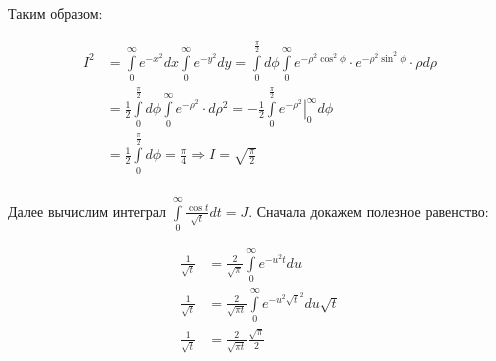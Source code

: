\documentclass{article}
\begin{document}
Таким образом:

\begin{equation*}
\begin{aligned}
I^2 &= \int\limits_0^{\infty} e^{-x^2}dx \int\limits_0^{\infty} e^{-y^2}dy = \int\limits_0^{\frac{\pi}{2}} d\phi \int\limits_0^{\infty} e^{-\rho^2 \cos^2{\phi}}\cdot e^{-\rho^2 \sin^2{\phi}}  \cdot \rho d\rho \\
&= \frac{1}{2}\int\limits_0^{\frac{\pi}{2}} d\phi \int\limits_0^{\infty} e^{-\rho^2}  \cdot  d\rho^2 = -\frac{1}{2}\int\limits_0^{\frac{\pi}{2}} \left. e^{-\rho^2} \right|_0^{\infty} d\phi\\
& = \frac{1}{2}\int\limits_0^{\frac{\pi}{2}} d\phi = \frac{\pi}{4} \Rightarrow I= \sqrt{\frac{\pi}{2}}\\
\end{aligned}
\end{equation*}

Далее вычислим интеграл $\int\limits_0^{\infty} \frac{\cos{t}}{\sqrt{t}} dt = J$. Сначала докажем полезное равенство:

\begin{equation*}
\begin{aligned}
\frac{1}{\sqrt{t}} &= \frac{2}{\sqrt{\pi}} \int\limits_0^{\infty} e^{-u^2 t}du \\
\frac{1}{\sqrt{t}} &= \frac{2}{\sqrt{\pi t}} \int\limits_0^{\infty} e^{-u^2 \sqrt{t}^2}du\sqrt{t} \\
\frac{1}{\sqrt{t}} &= \frac{2}{\sqrt{\pi t}} \frac{\sqrt{\pi}}{2}
\end{aligned}
\end{equation*}
\end{document}
